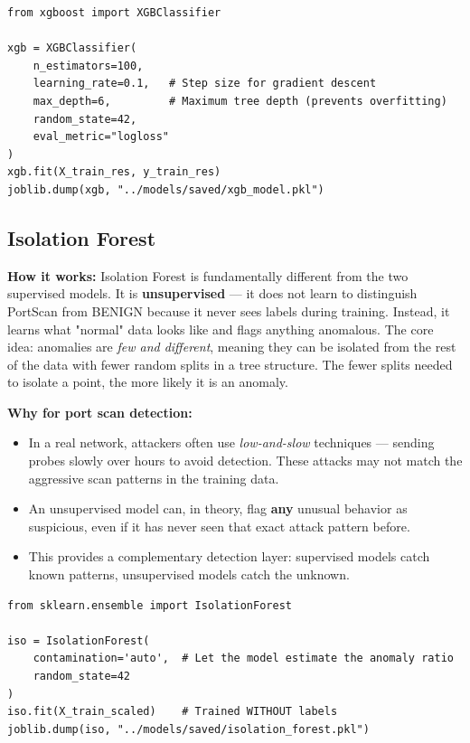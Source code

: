 \begin{lstlisting}[caption={XGBoost training}]
from xgboost import XGBClassifier

xgb = XGBClassifier(
    n_estimators=100,
    learning_rate=0.1,   # Step size for gradient descent
    max_depth=6,         # Maximum tree depth (prevents overfitting)
    random_state=42,
    eval_metric="logloss"
)
xgb.fit(X_train_res, y_train_res)
joblib.dump(xgb, "../models/saved/xgb_model.pkl")
\end{lstlisting}

\subsection{Isolation Forest}

\textbf{How it works:} Isolation Forest is fundamentally different from the two supervised models. It is \textbf{unsupervised} --- it does not learn to distinguish PortScan from BENIGN because it never sees labels during training. Instead, it learns what "normal" data looks like and flags anything anomalous. The core idea: anomalies are \textit{few and different}, meaning they can be isolated from the rest of the data with fewer random splits in a tree structure. The fewer splits needed to isolate a point, the more likely it is an anomaly.

\textbf{Why for port scan detection:}
\begin{itemize}
    \item In a real network, attackers often use \textit{low-and-slow} techniques --- sending probes slowly over hours to avoid detection. These attacks may not match the aggressive scan patterns in the training data.
    \item An unsupervised model can, in theory, flag \textbf{any} unusual behavior as suspicious, even if it has never seen that exact attack pattern before.
    \item This provides a complementary detection layer: supervised models catch known patterns, unsupervised models catch the unknown.
\end{itemize}

\begin{lstlisting}[caption={Isolation Forest training (unsupervised)}]
from sklearn.ensemble import IsolationForest

iso = IsolationForest(
    contamination='auto',  # Let the model estimate the anomaly ratio
    random_state=42
)
iso.fit(X_train_scaled)    # Trained WITHOUT labels
joblib.dump(iso, "../models/saved/isolation_forest.pkl")
\end{lstlisting}

